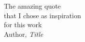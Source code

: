 %
%
%

\newpage
\thispagestyle{empty}
\setcounter{page}{1}
\vspace*{6cm}
\begin{flushright}
The amazing quote\\
that I chose as inspiration\\
for this work\\
\vspace{4mm}
Author, \textit{Title}\\
\end{flushright}
